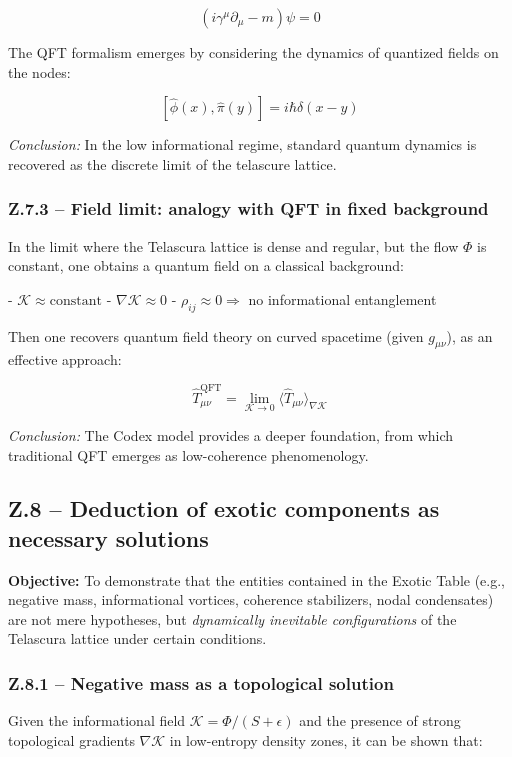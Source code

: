 \documentclass[12pt]{article}
\begin{document}
\[
(i\gamma^\mu \partial_\mu - m)\psi = 0
\]

The QFT formalism emerges by considering the dynamics of quantized fields on the nodes:

\[
[\hat{\phi}(x), \hat{\pi}(y)] = i\hbar \delta(x - y)
\]

\textit{Conclusion:} In the low informational regime, standard quantum dynamics is recovered as the discrete limit of the telascure lattice.

\subsubsection*{Z.7.3 – Field limit: analogy with QFT in fixed background}

In the limit where the Telascura lattice is dense and regular, but the flow $\Phi$ is constant, one obtains a quantum field on a classical background:

- $\mathcal{K} \approx \text{constant}$
- $\nabla \mathcal{K} \approx 0$
- $\rho_{ij} \approx 0 \Rightarrow$ no informational entanglement

Then one recovers quantum field theory on curved spacetime (given $g_{\mu\nu}$), as an effective approach:

\[
\hat{T}_{\mu\nu}^{\text{QFT}} = \lim_{\mathcal{K} \to 0} \langle \hat{T}_{\mu\nu} \rangle_{\nabla \mathcal{K}}
\]

\textit{Conclusion:} The Codex model provides a deeper foundation, from which traditional QFT emerges as low-coherence phenomenology.

\subsection*{Z.8 – Deduction of exotic components as necessary solutions}
\textbf{Objective:} To demonstrate that the entities contained in the Exotic Table (e.g., negative mass, informational vortices, coherence stabilizers, nodal condensates) are not mere hypotheses, but \emph{dynamically inevitable configurations} of the Telascura lattice under certain conditions.

\subsubsection*{Z.8.1 – Negative mass as a topological solution}

Given the informational field $\mathcal{K} = \Phi / (S + \epsilon)$ and the presence of strong topological gradients $\nabla \mathcal{K}$ in low-entropy density zones, it can be shown that:
\end{document}
